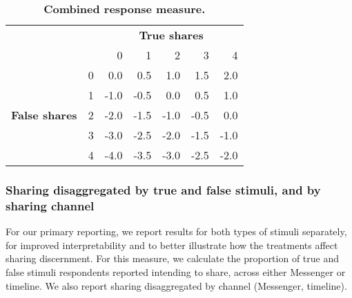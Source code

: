 \documentclass[letterpaper, 12pt, parskip=full,DIV=10]{scrartcl}
\begin{document}
\begin{table}[!ht]
\centering
\begin{tabular}{lrrrrrr}
                                   & & \multicolumn{5}{c}{\textbf{True shares}}     \\ 
                                   & & 0                    & 1                    & 2                                 & 3                    & \multicolumn{1}{r}{4}    \\  \cmidrule(lr){3-7}
\multicolumn{1}{l}{}              & \multicolumn{1}{r}{0} & 0.0                  & 0.5                  & 1.0                               & 1.5                  & \multicolumn{1}{r}{2.0}  \\
\multicolumn{1}{l}{}              & \multicolumn{1}{r}{1} & -1.0                 & -0.5                 & 0.0                               & 0.5                  & \multicolumn{1}{r}{1.0}  \\
\multicolumn{1}{l}{\textbf{False shares}} & \multicolumn{1}{r}{2} & -2.0                 & -1.5                 & -1.0                              & -0.5                 & \multicolumn{1}{r}{0.0}  \\
\multicolumn{1}{l}{}              & \multicolumn{1}{r}{3} & -3.0                 & -2.5                 & -2.0                              & -1.5                 & \multicolumn{1}{r}{-1.0} \\
\multicolumn{1}{l}{}              & \multicolumn{1}{r}{4} & -4.0                 & -3.5                 & -3.0                              & -2.5                 & \multicolumn{1}{r}{-2.0} \\ 
\end{tabular}
\caption{\textbf{Combined response measure.}}
\label{tab:response_fun}
\end{table}

\subsubsection{Sharing disaggregated by true and false stimuli, and by sharing channel}
For our primary reporting, we report results for both types of stimuli separately, for improved interpretability and to better illustrate how the treatments affect sharing discernment. For this measure, we calculate the proportion of true and false stimuli respondents reported intending to share, across either Messenger or timeline. We also report sharing disaggregated by channel (Messenger, timeline).  
\end{document}

